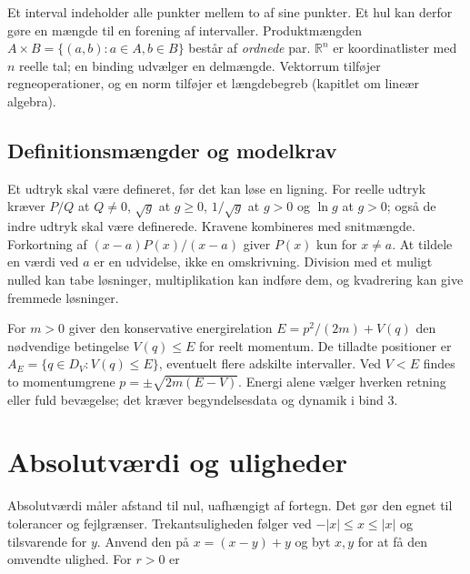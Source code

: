 

Et interval indeholder alle punkter mellem to af sine punkter.
Et hul kan derfor gøre en mængde til en forening af intervaller.
Produktmængden $A\times B=\{(a,b):a\in A,b\in B\}$ består af
\emph{ordnede} par. $\mathbb R^n$ er koordinatlister med $n$ reelle tal;
en binding udvælger en delmængde. Vektorrum tilføjer regneoperationer,
og en norm tilføjer et længdebegreb (kapitlet om lineær algebra).

\subsection{Definitionsmængder og modelkrav}
\label{sec:definitionsmaengder}
Et udtryk skal være defineret, før det kan løse en ligning.
For reelle udtryk kræver $P/Q$ at $Q\ne0$, $\sqrt g$ at $g\ge0$,
$1/\sqrt g$ at $g>0$ og $\ln g$ at $g>0$; også de indre udtryk skal
være definerede. Kravene kombineres med snitmængde.
Forkortning af $(x-a)P(x)/(x-a)$ giver $P(x)$ kun for $x\ne a$.
At tildele en værdi ved $a$ er en udvidelse, ikke en omskrivning.
Division med et muligt nulled kan tabe løsninger, multiplikation kan
indføre dem, og kvadrering kan give fremmede løsninger.

\label{sec:maengder-fysik}
For $m>0$ giver den konservative energirelation
$E=p^2/(2m)+V(q)$ den nødvendige betingelse $V(q)\le E$ for reelt momentum.
De tilladte positioner er $A_E=\{q\in D_V:V(q)\le E\}$, eventuelt flere
adskilte intervaller. Ved $V<E$ findes to momentumgrene
$p=\pm\sqrt{2m(E-V)}$. Energi alene vælger hverken retning eller fuld
bevægelse; det kræver begyndelsesdata og dynamik i bind 3.

\section{Absolutværdi og uligheder}
\label{sec:b1-uligheder}
Absolutværdi måler afstand til nul, uafhængigt af fortegn.
Det gør den egnet til tolerancer og fejlgrænser.
Trekantsuligheden følger ved $-|x|\le x\le|x|$ og tilsvarende for $y$.
Anvend den på $x=(x-y)+y$ og byt $x,y$ for at få den omvendte
ulighed. For $r>0$ er


